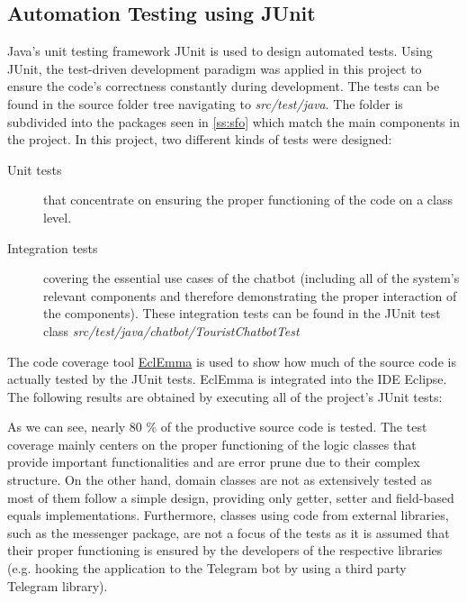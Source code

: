 \subsection{Automation Testing using JUnit}
Java’s unit testing framework JUnit is used to design automated tests. Using JUnit, the test-driven development paradigm was applied in this project to ensure the code’s correctness constantly during development. The tests can be found in the source folder tree navigating to \textit{src/test/java}. The folder is subdivided into the packages seen in \ref{ss:sfo} which match the main components in the project. In this project, two different kinds of tests were designed:
\begin{description}
\item[Unit tests] that concentrate on ensuring the proper functioning of the code on a class level. 
\item[Integration tests] covering the essential use cases of the chatbot (including all of the system’s relevant components and therefore demonstrating the proper interaction of the components). These integration tests can be found in the JUnit test class \textit{src/test/java/chatbot/TouristChatbotTest}
\end{description}

The code coverage tool \href{http://www.eclemma.org/}{EclEmma} is used to show how much of the source code is actually tested by the JUnit tests. EclEmma is integrated into the IDE Eclipse. The following results are obtained by executing all of the project’s JUnit tests:


As we can see, nearly 80 \% of the productive source code is tested. The test coverage mainly centers on the proper functioning of the logic classes that provide important functionalities and are error prune due to their complex structure. On the other hand, domain classes are not as extensively tested as most of them follow a simple design, providing only getter, setter and field-based equals implementations. Furthermore, classes using code from external libraries, such as the messenger package, are not a focus of the tests as it is assumed that their proper functioning is ensured by the developers of the respective libraries (e.g. hooking the application to the Telegram bot by using a third party Telegram library).

